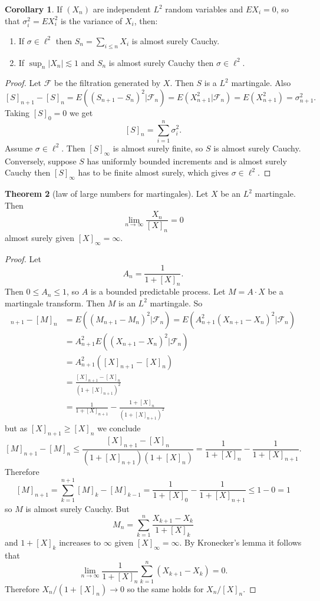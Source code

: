 \documentclass[12pt]{book}
\theoremstyle{definition}
\newtheorem{theorem}{Theorem}[chapter]
\newtheorem{corollary}[theorem]{Corollary}
\begin{document}
\begin{corollary}
If $(X_n)$ are independent $L^2$ random variables and $EX_i = 0$, so that $\sigma_i^2 = EX_i^2$ is the variance of $X_i$, then:
\begin{enumerate}
\item If $\sigma \in \ell^2$ then $S_n = \sum_{i \leq n} X_i$ is almost surely Cauchy.
\item If $\sup_n |X_n| \lesssim 1$ and $S_n$ is almost surely Cauchy then $\sigma \in \ell^2$.
\end{enumerate}
\end{corollary}
\begin{proof}
Let $\mathcal F$ be the filtration generated by $X$.
Then $S$ is a $L^2$ martingale.
Also
$$[S]_{n+1} - [S]_n = E((S_{n+1} - S_n)^2|\mathcal F_n) = E(X_{n+1}^2|\mathcal F_n) = E(X_{n+1}^2) = \sigma_{n+1}^2.$$
Taking $[S]_0 = 0$ we get
$$[S]_n = \sum_{i=1}^n \sigma_i^2.$$
Assume $\sigma \in \ell^2$. Then $[S]_\infty$ is almost surely finite, so $S$ is almost surely Cauchy.
Conversely, suppose $S$ has uniformly bounded increments and is almost surely Cauchy then $[S]_\infty$ has to be finite almost surely, which gives $\sigma \in \ell^2$.
\end{proof}

\begin{theorem}[law of large numbers for martingales]
Let $X$ be an $L^2$ martingale. Then
$$\lim_{n \to \infty} \frac{X_n}{[X]_n} = 0$$
almost surely given $[X]_\infty = \infty$.
\end{theorem}
\begin{proof}
Let
$$A_n = \frac{1}{1 + [X]_n}.$$
Then $0 \leq A_n \leq 1$, so $A$ is a bounded predictable process.
Let $M = A \cdot X$ be a martingale transform.
Then $M$ is an $L^2$ martingale.
So
\begin{align*}
[M]_{n+1} - [M]_n &= E((M_{n+1} - M_n)^2|\mathcal F_n) = E(A_{n+1}^2(X_{n+1} - X_n)^2|\mathcal F_n) \\
&= A_{n+1}^2 E((X_{n+1} - X_n)^2|\mathcal F_n)\\
&= A_{n+1}^2 ([X]_{n+1} - [X]_n)\\
&= \frac{[X]_{n+1} - [X]_n}{(1 + [X]_{n+1})^2}\\
&= \frac{1}{1 + [X]_{n+1}} - \frac{1+ [X]_n}{(1 + [X]_{n+1})^2}
\end{align*}
but as $[X]_{n+1} \geq [X]_n$ we conclude
$$[M]_{n+1} - [M]_n \leq \frac{[X]_{n+1} - [X]_n}{(1 + [X]_{n+1})(1 + [X]_n)} = \frac{1}{1 + [X]_n} - \frac{1}{1 + [X]_{n+1}}.$$
Therefore
$$[M]_{n+1} = \sum_{k=1}^{n+1} [M]_k - [M]_{k-1} = \frac{1}{1 + [X]_0} - \frac{1}{1 + [X]_{n+1}} \leq 1 - 0 = 1$$
so $M$ is almost surely Cauchy. But
$$M_n = \sum_{k=1}^n \frac{X_{k+1} - X_k}{1 + [X]_k}$$
and $1 + [X]_k$ increases to $\infty$ given $[X]_\infty = \infty$.
By Kronecker's lemma it follows that
$$\lim_{n \to \infty} \frac{1}{1 + [X]_n} \sum_{k=1}^n (X_{k+1} - X_k) = 0.$$
Therefore $X_n/(1 + [X]_n) \to 0$ so the same holds for $X_n/[X]_n$.
\end{proof}
\end{document}
